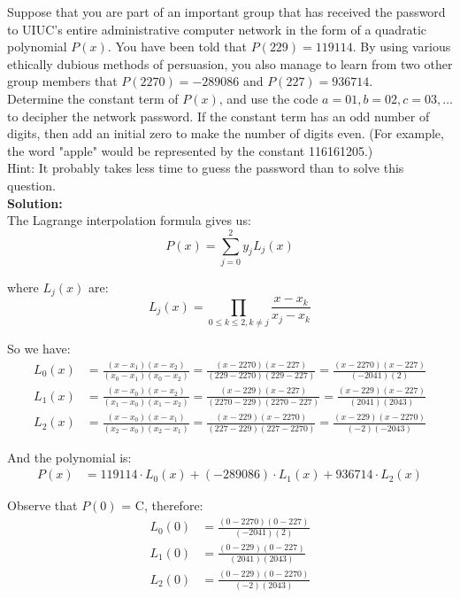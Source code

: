 \documentclass{article}
\begin{document}
Suppose that you are part of an important group that has received the password to UIUC's entire administrative computer network in the form of a quadratic polynomial $P(x)$. You have been told that $P(229) = 119114$. By using various ethically dubious methods of persuasion, you also manage to learn from two other group members that $P(2270) = -289086$ and $P(227) = 936714$. \\

Determine the constant term of $P(x)$, and use the code $a = 01, b = 02, c = 03, \ldots$ to decipher the network password. If the constant term has an odd number of digits, then add an initial zero to make the number of digits even. (For example, the word "apple" would be represented by the constant 116161205.) \\

Hint: It probably takes less time to guess the password than to solve this question. \\

\textbf{Solution:} \\

The Lagrange interpolation formula gives us:
$$P(x) = \sum_{j=0}^{2} y_j L_j(x)$$

where $L_j(x)$ are:
$$L_j(x) = \prod_{0 \leq k \leq 2, k \neq j} \frac{x - x_k}{x_j - x_k}$$

So we have:
\begin{align*}
L_0(x) &= \frac{(x - x_1)(x - x_2)}{(x_0 - x_1)(x_0 - x_2)} = \frac{(x - 2270)(x - 227)}{(229 - 2270)(229 - 227)} = \frac{(x - 2270)(x - 227)}{(-2041)(2)} \\
L_1(x) &= \frac{(x - x_0)(x - x_2)}{(x_1 - x_0)(x_1 - x_2)} = \frac{(x - 229)(x - 227)}{(2270 - 229)(2270 - 227)} = \frac{(x - 229)(x - 227)}{(2041)(2043)} \\
L_2(x) &= \frac{(x - x_0)(x - x_1)}{(x_2 - x_0)(x_2 - x_1)} = \frac{(x - 229)(x - 2270)}{(227 - 229)(227 - 2270)} = \frac{(x - 229)(x - 2270)}{(-2)(-2043)}
\end{align*}

And the polynomial is:
\begin{align*}
P(x) &= 119114 \cdot L_0(x) + (-289086) \cdot L_1(x) + 936714 \cdot L_2(x)
\end{align*}

Observe that $P(0)$ = C, therefore:
\begin{align*}
L_0(0) &= \frac{(0 - 2270)(0 - 227)}{(-2041)(2)}\\
L_1(0) &= \frac{(0 - 229)(0 - 227)}{(2041)(2043)}\\
L_2(0) &= \frac{(0 - 229)(0 - 2270)}{(-2)(2043)}
\end{align*}
\end{document}
